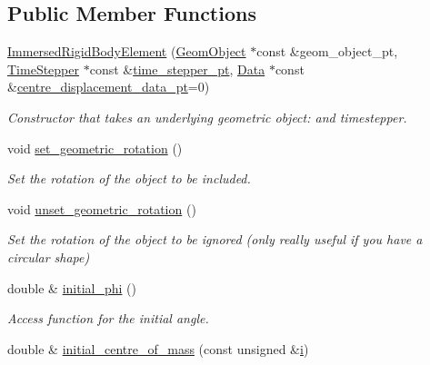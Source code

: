 \subsection*{Public Member Functions}
\begin{DoxyCompactItemize}
\item 
\hyperlink{classoomph_1_1ImmersedRigidBodyElement_ada7e9e80771ed9df5f236b371ca66f84}{Immersed\+Rigid\+Body\+Element} (\hyperlink{classoomph_1_1GeomObject}{Geom\+Object} $\ast$const \&geom\+\_\+object\+\_\+pt, \hyperlink{classoomph_1_1TimeStepper}{Time\+Stepper} $\ast$const \&\hyperlink{classoomph_1_1GeomObject_a3c92023891dd4a0e818022f467eeb7f1}{time\+\_\+stepper\+\_\+pt}, \hyperlink{classoomph_1_1Data}{Data} $\ast$const \&\hyperlink{classoomph_1_1ImmersedRigidBodyElement_ac1e912d596869720566ab2264aa60d6c}{centre\+\_\+displacement\+\_\+data\+\_\+pt}=0)
\begin{DoxyCompactList}\small\item\em Constructor that takes an underlying geometric object\+: and timestepper. \end{DoxyCompactList}\item 
void \hyperlink{classoomph_1_1ImmersedRigidBodyElement_afbc443daa2200a53b96dc3295e821461}{set\+\_\+geometric\+\_\+rotation} ()
\begin{DoxyCompactList}\small\item\em Set the rotation of the object to be included. \end{DoxyCompactList}\item 
void \hyperlink{classoomph_1_1ImmersedRigidBodyElement_ac1aaf7a8872fa3e02201ed13eb122c59}{unset\+\_\+geometric\+\_\+rotation} ()
\begin{DoxyCompactList}\small\item\em Set the rotation of the object to be ignored (only really useful if you have a circular shape) \end{DoxyCompactList}\item 
double \& \hyperlink{classoomph_1_1ImmersedRigidBodyElement_aaaff87f9808037afd0ef9adebfb0ebde}{initial\+\_\+phi} ()
\begin{DoxyCompactList}\small\item\em Access function for the initial angle. \end{DoxyCompactList}\item 
double \& \hyperlink{classoomph_1_1ImmersedRigidBodyElement_a3c436ba641c221d647dd21a67a583c49}{initial\+\_\+centre\+\_\+of\+\_\+mass} (const unsigned \&\hyperlink{cfortran_8h_adb50e893b86b3e55e751a42eab3cba82}{i})

\end{DoxyCompactItemize}
